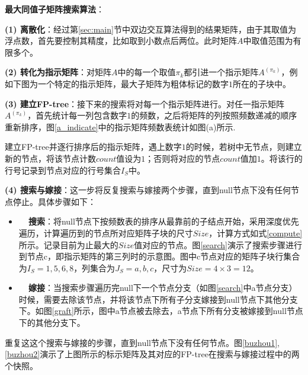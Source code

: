 \vspace{2mm}
\textbf{最大同值子矩阵搜索算法}：

\textbf{(1) 离散化}：经过第\ref{sec:main}节中双边交互算法得到的结果矩阵，由于其取值为浮点数，首先要控制其精度，比如取到小数点后两位。此时矩阵$A$中取值范围为有限多个。

\textbf{(2) 转化为指示矩阵}：对矩阵$A$中的每一个取值$\pi_k$都引进一个指示矩阵$A^{(\pi_k)}$，例如下图为一个特定的指示矩阵，最大子矩阵为粗体标记的数字$1$所在的子块中。
\vspace{-1mm}

\textbf{(3) 建立FP-tree}：接下来的搜索将对每一个指示矩阵进行。对任一指示矩阵$A^{(\pi_k)}$，首先统计每一列包含数字$1$的频数，之后将矩阵的列按照频数递减的顺序重新排序，图\ref{a_indicate}中的指示矩阵频数表统计如图(a)所示.
\vspace{-1mm}

建立FP-tree并逐行排序后的指示矩阵，遇上数字$1$的时候，若树中无节点，则建立新的节点，将该节点计数$count$值设为$1$；否则将对应的节点$count$值加$1$。将该行的行号记录到节点对应的行号集合$I_S$中。

\textbf{(4) 搜索与嫁接}：这一步将反复搜索与嫁接两个步骤，直到null节点下没有任何节点停止。具体步骤如下：
\begin{itemize}
\item \textbf{~~搜索}：将null节点下按频数表的排序从最靠前的子结点开始，采用深度优先遍历，计算遍历到的节点所对应矩阵子块的尺寸$Size$，计算方式如式\ref{compute}所示。记录目前为止最大的$Size$值对应的节点。图\ref{search}演示了搜索步骤进行到节点c，即指示矩阵的第三列时的示意图。图中c节点对应的矩阵子块行集合为$I_S={1,5,6,8}$，列集合为$J_S={a,b,c}$，尺寸为$Size=4\times3=12$。
\vspace{-1mm}

\item \textbf{~~嫁接}：当搜索步骤遍历完null下一个节点分支（如图\ref{search}中a节点分支）时候，需要去除该节点，并将该节点下所有子分支嫁接到null节点下其他分支下。如图\ref{graft}所示，图中a节点被去除去，a节点下所有分支被嫁接到null节点下的其他分支下。

\end{itemize}

重复这这个搜索与嫁接的步骤，直到null节点下没有任何节点。图\ref{buzhou1},\ref{buzhou2}演示了上图所示的标示矩阵及其对应的FP-tree在搜索与嫁接过程中的两个快照。
\vspace{-3mm}

